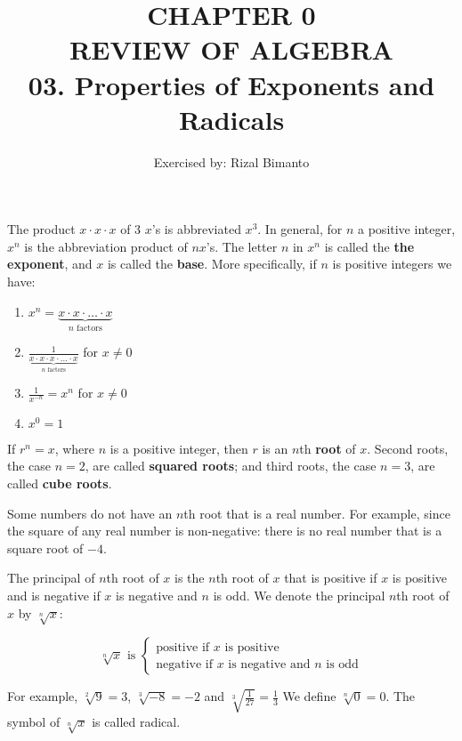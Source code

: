 \documentclass{article}
\title{CHAPTER 0\\
REVIEW OF ALGEBRA\\
03. Properties of Exponents and Radicals
}
\author{Exercised by: Rizal Bimanto}
\date{}
\begin{document}
\maketitle

\begin{onehalfspace}
    The product $x \cdot x \cdot x$ of 3 $x$'s is abbreviated $x^{3}$.
    In general, for $n$ a positive integer, $x^{n}$ is the abbreviation product
    of $n x$'s. The letter $n$ in $x^{n}$ is called the \textbf{the exponent},
    and $x$ is called the \textbf{base}. More specifically, if $n$ is positive integers we have:

    \begin{enumerate}
        \item $x^n = \underbrace{x \cdot x \cdot \ldots \cdot x} _ {n \text{ factors}}$
        \item $\frac {1}{\underbrace{x \cdot x \cdot x \cdot \ldots \cdot x}_{n \text{ factors}}}$ for $x \neq 0$
        \item $\frac {1}{x^{-n}} = x^{n}$ for $x \neq 0$
        \item $x^{0} = 1$
    \end{enumerate}

    If $r^{n} = x$, where $n$ is a positive integer, then $r$ is an $n$th \textbf{root} of $x$.
    Second roots, the case $n = 2$, are called \textbf{squared roots};
    and third roots, the case $n = 3$, are called \textbf{cube roots}.

    Some numbers do not have an $n$th root that is a real number.
    For example, since the square of any real number is non-negative:
    there is no real number that is a square root of $-4$.

    The principal of $n$th root of $x$ is the $n$th root of $x$
    that is positive if $x$ is positive and is negative if $x$ is negative
    and $n$ is odd. We denote the principal $n$th root of
    $x$ by $\sqrt[n]{x}$:

    \begin{center}
    \[
    \sqrt[n]{x} \text{ is }
        \begin{cases} 
        \text{positive if } x \text{ is positive} \\
        \text{negative if } x \text{ is negative and } n \text{ is odd}
        \end{cases}
    \]
    \end{center}

    For example, $\sqrt[2]{9} = 3$, $\sqrt[3]{-8} = -2$ and $\sqrt[3]{\frac{1}{27}} = \frac{1}{3}$
    We define $\sqrt[n]{0} = 0$.
    \newline
    The symbol of $\sqrt[n]{x}$ is called radical.


\end{onehalfspace}
\end{document}
